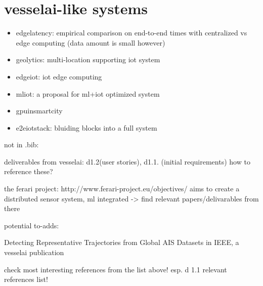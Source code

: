 \documentclass{article}
\begin{document}
\chapter{vesselai-like systems}

\begin{itemize}
    \item \cite{edgelatency} edgelatency: empirical comparison on end-to-end times with centralized vs edge computing (data amount is small however)
    \item \cite{geolytics} geolytics: multi-location supporting iot system
    \item \cite{edgeiot} edgeiot: iot edge computing
    \item \cite{mliot} mliot: a proposal for ml+iot optimized system
    \item \cite{gpuinsmartcity} gpuinsmartcity
    \item \cite{e2eiotstack} e2eiotstack: bluiding blocks into a full system
\end{itemize}

not in .bib:

deliverables from vesselai: d1.2(user stories), d1.1. (initial requirements) how to reference these?

the ferari project: http://www.ferari-project.eu/objectives/ aims to create a distributed sensor system, ml integrated
-> find relevant papers/delivarables from there

potential to-adds:

Detecting Representative Trajectories from Global AIS Datasets in IEEE, a vesselai publication

check most interesting references from the list above! esp. d 1.1 relevant references list!

\printbibliography
\end{document}
